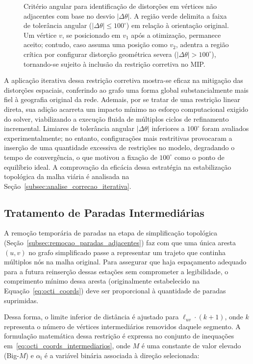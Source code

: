 \documentclass[cic,tc]{infufrgs}
\begin{document}
\begin{figure}[H]
    \caption{Critério angular para identificação de distorções em vértices não adjacentes com base no desvio $|\Delta\theta|$. A região verde delimita a faixa de tolerância angular ($|\Delta\theta| \le 100^\circ$) em relação à orientação original. Um vértice $v$, se posicionado em $v_1$ após a otimização, permanece aceito; contudo, caso assuma uma posição como $v_2$, adentra a região crítica por configurar distorção geométrica severa ($|\Delta\theta| > 100^\circ$), tornando-se sujeito à inclusão da restrição corretiva no MIP.}
    \label{fig:criterio_angular_pos_processamento}
\end{figure}

A aplicação iterativa dessa restrição corretiva mostra-se eficaz na mitigação das distorções espaciais, conferindo ao grafo uma forma global substancialmente mais fiel à geografia original da rede. Ademais, por se tratar de uma restrição linear direta, sua adição acarreta um impacto mínimo no esforço computacional exigido do solver, viabilizando a execução fluida de múltiplos ciclos de refinamento incremental. Limiares de tolerância angular $|\Delta\theta|$ inferiores a $100^\circ$ foram avaliados experimentalmente; no entanto, configurações mais restritivas provocaram a inserção de uma quantidade excessiva de restrições no modelo, degradando o tempo de convergência, o que motivou a fixação de $100^\circ$ como o ponto de equilíbrio ideal. A comprovação da eficácia dessa estratégia na estabilização topológica da malha viária é analisada na Seção~\ref{subsec:analise_correcao_iterativa}.

\subsection{Tratamento de Paradas Intermediárias}

A remoção temporária de paradas na etapa de simplificação topológica (Seção~\ref{subsec:remocao_paradas_adjacentes}) faz com que uma única aresta $(u, v)$ no grafo simplificado passe a representar um trajeto que continha múltiplos nós na malha original. Para assegurar que haja espaçamento adequado para a futura reinserção dessas estações sem comprometer a legibilidade, o comprimento mínimo dessa aresta (originalmente estabelecido na Equação~\ref{eq:octi_coords}) deve ser proporcional à quantidade de paradas suprimidas.

Dessa forma, o limite inferior de distância é ajustado para $\ell_{uv} \cdot (k + 1)$, onde $k$ representa o número de vértices intermediários removidos daquele segmento. A formulação matemática dessa restrição é expressa no conjunto de inequações em~\ref{eq:octi_coords_intermediarios}, onde $M$ é uma constante de valor elevado (Big-$M$) e $\alpha_{\text{i}}$ é a variável binária associada à direção selecionada:
\end{document}
